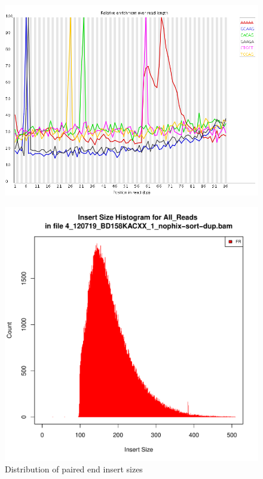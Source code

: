 \documentclass{article}
\begin{document}
    \begin{figure}[htbp]
      \centering
      \includegraphics[width=0.85\linewidth] {fastqc/4_120719_BD158KACXX_1_nophix-sort-dup_fastqc/Images/kmer_profiles.png}
      \caption{}
    \end{figure}
    \begin{figure}[htbp]
      \centering
      \includegraphics[width=0.75\linewidth] {4_120719_BD158KACXX_1_nophix-sort-dup-insert.pdf}
      \caption{Distribution of paired end insert sizes}
    \end{figure}


\FloatBarrier
\FloatBarrier
\end{document}
